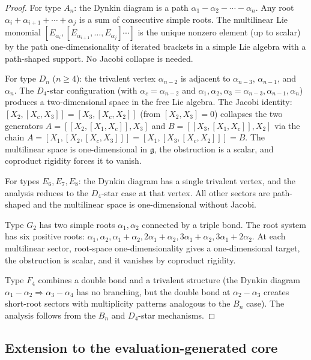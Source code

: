 \documentclass[11pt,reqno]{amsart}
\theoremstyle{definition}
\theoremstyle{remark}
\newcommand{\fg}{\mathfrak{g}}
\numberwithin{equation}{section}
\begin{document}
\begin{proof}
For type $A_n$: the Dynkin diagram is a path
$\alpha_1 - \alpha_2 - \cdots - \alpha_n$.  Any root
$\alpha_{i} + \alpha_{i+1} + \cdots + \alpha_j$ is a sum
of consecutive simple roots.  The multilinear Lie monomial
$[E_{\alpha_i}, [E_{\alpha_{i+1}}, \ldots, E_{\alpha_j}]
\cdots]$ is the unique nonzero element (up to scalar) by
the path one-dimensionality of iterated brackets in a
simple Lie algebra with a path-shaped support.  No Jacobi
collapse is needed.

For type $D_n$ ($n \geq 4$): the trivalent vertex
$\alpha_{n-2}$ is adjacent to $\alpha_{n-3}$,
$\alpha_{n-1}$, and $\alpha_n$.  The $D_4$-star
configuration (with $\alpha_c = \alpha_{n-2}$ and
$\alpha_1, \alpha_2, \alpha_3 = \alpha_{n-3}, \alpha_{n-1},
\alpha_n$) produces a two-dimensional space in the free Lie
algebra.  The Jacobi identity:
$[X_2, [X_c, X_3]] = [X_3, [X_c, X_2]]$
(from $[X_2, X_3] = 0$) collapses the two generators
$A = [[X_2, [X_1, X_c]], X_3]$ and
$B = [[X_3, [X_1, X_c]], X_2]$ via the chain
$A = [X_1, [X_2, [X_c, X_3]]]
= [X_1, [X_3, [X_c, X_2]]] = B$.
The multilinear space is one-dimensional in $\fg$, the
obstruction is a scalar, and coproduct rigidity forces it
to vanish.

For types $E_6, E_7, E_8$: the Dynkin diagram has a single
trivalent vertex, and the analysis reduces to the
$D_4$-star case at that vertex.  All other sectors are
path-shaped and the multilinear space is one-dimensional
without Jacobi.

Type $G_2$ has two simple roots $\alpha_1, \alpha_2$
connected by a triple bond.  The root system has six
positive roots:
$\alpha_1, \alpha_2, \alpha_1 + \alpha_2,
2\alpha_1 + \alpha_2, 3\alpha_1 + \alpha_2,
3\alpha_1 + 2\alpha_2$.
At each multilinear sector, root-space one-dimensionality
gives a one-dimensional target, the obstruction is scalar,
and it vanishes by coproduct rigidity.

Type $F_4$ combines a double bond and a trivalent structure
(the Dynkin diagram $\alpha_1 - \alpha_2 \Rightarrow
\alpha_3 - \alpha_4$ has no branching, but the double bond
at $\alpha_2 - \alpha_3$ creates short-root sectors with
multiplicity patterns analogous to the $B_n$ case).  The
analysis follows from the $B_n$ and $D_4$-star mechanisms.
\end{proof}

\subsection{Extension to the evaluation-generated core}
\end{document}
